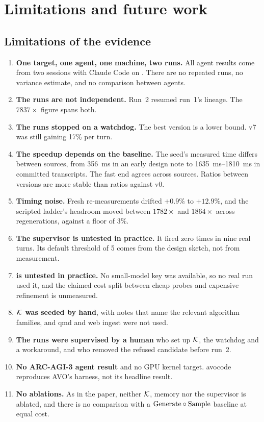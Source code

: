 \section{Limitations and future work}
\label{sec:limits}

\subsection{Limitations of the evidence}

\begin{enumerate}[leftmargin=*,itemsep=2pt]
  \item \textbf{One target, one agent, one machine, two runs.} All agent results come from two
     sessions with Claude Code on . There are no repeated runs, no
    variance estimate, and no comparison between agents.
  \item \textbf{The runs are not independent.} Run~2 resumed run~1's lineage. The $7837\times$
    figure spans both.
  \item \textbf{The runs stopped on a watchdog.} The best version is a lower bound. v7 was still
    gaining 17\% per turn.
  \item \textbf{The speedup depends on the baseline.} The seed's measured time differs between
    sources, from \SI{356}{ms} in an early design note to \SIrange{1635}{1810}{ms} in committed
    transcripts. The fast end agrees across sources. Ratios between versions are more stable than
    ratios against v0.
  \item \textbf{Timing noise.} Fresh re-measurements drifted $+0.9\%$ to $+12.9\%$, and the
    scripted ladder's headroom moved between $1782\times$ and $1864\times$ across regenerations,
    against a floor of 3\%.
  \item \textbf{The supervisor is untested in practice.} It fired zero times in nine real turns. Its
    default threshold of 5 comes from the design sketch, not from measurement.
  \item \textbf{ is untested in practice.} No small-model key was available, so no real
    run used it, and the claimed cost split between cheap probes and expensive refinement is
    unmeasured.
  \item \textbf{$\mathcal{K}$ was seeded by hand}, with notes that name the relevant algorithm families, and
    qmd and web ingest were not used.
  \item \textbf{The runs were supervised by a human} who set up $\mathcal{K}$, the watchdog and a
     workaround, and who removed the refused candidate before run~2.
  \item \textbf{No ARC-AGI-3 agent result} and no GPU kernel target. avocode reproduces AVO's
    harness, not its headline result.
  \item \textbf{No ablations.} As in the paper, neither $\mathcal{K}$, memory nor the supervisor is ablated,
    and there is no comparison with a $\mathrm{Generate} \circ \mathrm{Sample}$ baseline at equal cost.
\end{enumerate}

